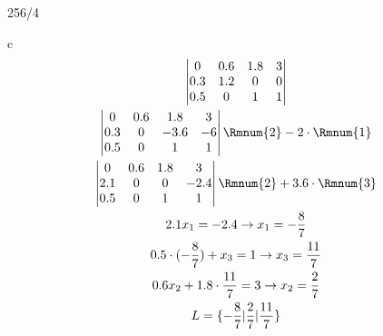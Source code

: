 \begin{exercise}{256/4}
  \item [c]
  \begin{gather*}
    \begin{vmatrix}
      0 & 0.6 & 1.8 & 3 \\
      0.3 & 1.2 & 0 & 0 \\
      0.5 & 0 & 1 & 1
    \end{vmatrix} \\
    \begin{vmatrix}
      0 & 0.6 & 1.8 & 3 \\
      0.3 & 0 & -3.6 & -6 \\
      0.5 & 0 & 1 & 1 \\
    \end{vmatrix} \Rmnum{2} - 2 \cdot \Rmnum{1} \\
    \begin{vmatrix}
      0 & 0.6 & 1.8 & 3 \\
      2.1 & 0 & 0 & -2.4 \\
      0.5 & 0 & 1 & 1 \\
    \end{vmatrix} \Rmnum{2} + 3.6 \cdot \Rmnum{3} \\
    2.1x_1 = -2.4 \rightarrow x_1 = -\frac{8}{7} \\
    0.5 \cdot (-\frac{8}{7}) + x_3 = 1 \rightarrow x_3 = \frac{11}{7} \\
    0.6x_2 + 1.8 \cdot \frac{11}{7} = 3 \rightarrow x_2 = \frac{2}{7} \\
    L = \{-\frac{8}{7}|\frac{2}{7}|\frac{11}{7}\}
  \end{gather*}
\end{exercise}
